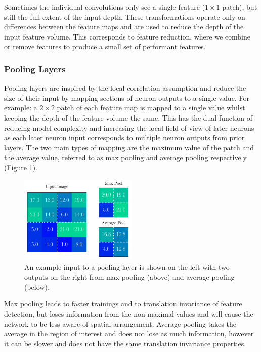 Sometimes the individual convolutions only see a single feature ($1\times{}1$ patch), but still the full extent of the input depth. These transformations operate only on differences between the feature maps and are used to reduce the depth of the input feature volume. 
This corresponds to feature reduction, where we combine or remove features to produce a small set of performant features. 



\subsubsection{Pooling Layers}
Pooling layers are inspired by the local correlation assumption and reduce the size of their input by mapping sections of neuron outputs to a single value. For example: a $2\times{}2$ patch of each feature map is mapped to a single value whilst keeping the depth of the feature volume the same.
This has the dual function of reducing model complexity and increasing the local field of view of later neurons as each later neuron input corresponds to multiple neuron outputs from prior layers. 
The two main types of mapping are the maximum value of the patch and the average value, referred to as max pooling and average pooling respectively (Figure \ref{fig:machine_learning:pooling}). 
\begin{figure}[h!]
    \centering
    \includegraphics[width=0.5\textwidth]{figures/machine_learning/pooling.pdf}
    \caption{An example input to a pooling layer is shown on the left with two outputs on the right from max pooling (above) and average pooling (below).}
        \label{fig:machine_learning:pooling}
\end{figure}

Max pooling leads to faster trainings and to translation invariance of feature detection, but loses information from the non-maximal values and will cause the network to be less aware of spatial arrangement.  
Average pooling takes the average in the region of interest and does not lose as much information, however it can be slower and does not have the same translation invariance properties. 


